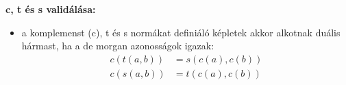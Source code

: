 \textbf{c, t és s validálása:}
\begin{itemize}
    \item a komplemenst (c), t és s normákat definiáló képletek akkor alkotnak duális hármast, ha a de morgan azonosságok igazak:
    \begin{align*}
        c(t(a, b)) &= s(c(a), c(b)) \\
        c(s(a, b)) &= t(c(a), c(b))
    \end{align*}
\end{itemize}